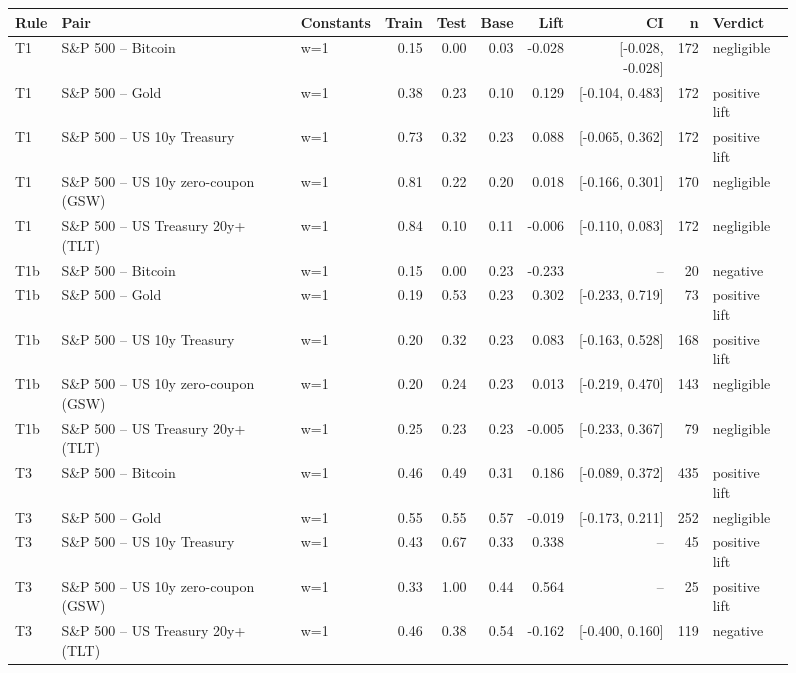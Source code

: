 \begin{figure}
\centering
\begin{tabular}{lllrrrrrrl}
\toprule
Rule & Pair & Constants & Train & Test & Base & Lift & CI & n & Verdict \\
\midrule
T1 & S\&P 500 -- Bitcoin & w=1 & 0.15 & 0.00 & 0.03 & -0.028 & [-0.028, -0.028] & 172 & negligible \\
T1 & S\&P 500 -- Gold & w=1 & 0.38 & 0.23 & 0.10 & 0.129 & [-0.104, 0.483] & 172 & positive lift \\
T1 & S\&P 500 -- US 10y Treasury & w=1 & 0.73 & 0.32 & 0.23 & 0.088 & [-0.065, 0.362] & 172 & positive lift \\
T1 & S\&P 500 -- US 10y zero-coupon (GSW) & w=1 & 0.81 & 0.22 & 0.20 & 0.018 & [-0.166, 0.301] & 170 & negligible \\
T1 & S\&P 500 -- US Treasury 20y+ (TLT) & w=1 & 0.84 & 0.10 & 0.11 & -0.006 & [-0.110, 0.083] & 172 & negligible \\
T1b & S\&P 500 -- Bitcoin & w=1 & 0.15 & 0.00 & 0.23 & -0.233 & -- & 20 & negative \\
T1b & S\&P 500 -- Gold & w=1 & 0.19 & 0.53 & 0.23 & 0.302 & [-0.233, 0.719] & 73 & positive lift \\
T1b & S\&P 500 -- US 10y Treasury & w=1 & 0.20 & 0.32 & 0.23 & 0.083 & [-0.163, 0.528] & 168 & positive lift \\
T1b & S\&P 500 -- US 10y zero-coupon (GSW) & w=1 & 0.20 & 0.24 & 0.23 & 0.013 & [-0.219, 0.470] & 143 & negligible \\
T1b & S\&P 500 -- US Treasury 20y+ (TLT) & w=1 & 0.25 & 0.23 & 0.23 & -0.005 & [-0.233, 0.367] & 79 & negligible \\
T3 & S\&P 500 -- Bitcoin & w=1 & 0.46 & 0.49 & 0.31 & 0.186 & [-0.089, 0.372] & 435 & positive lift \\
T3 & S\&P 500 -- Gold & w=1 & 0.55 & 0.55 & 0.57 & -0.019 & [-0.173, 0.211] & 252 & negligible \\
T3 & S\&P 500 -- US 10y Treasury & w=1 & 0.43 & 0.67 & 0.33 & 0.338 & -- & 45 & positive lift \\
T3 & S\&P 500 -- US 10y zero-coupon (GSW) & w=1 & 0.33 & 1.00 & 0.44 & 0.564 & -- & 25 & positive lift \\
T3 & S\&P 500 -- US Treasury 20y+ (TLT) & w=1 & 0.46 & 0.38 & 0.54 & -0.162 & [-0.400, 0.160] & 119 & negative \\

\end{tabular}
\end{figure}
